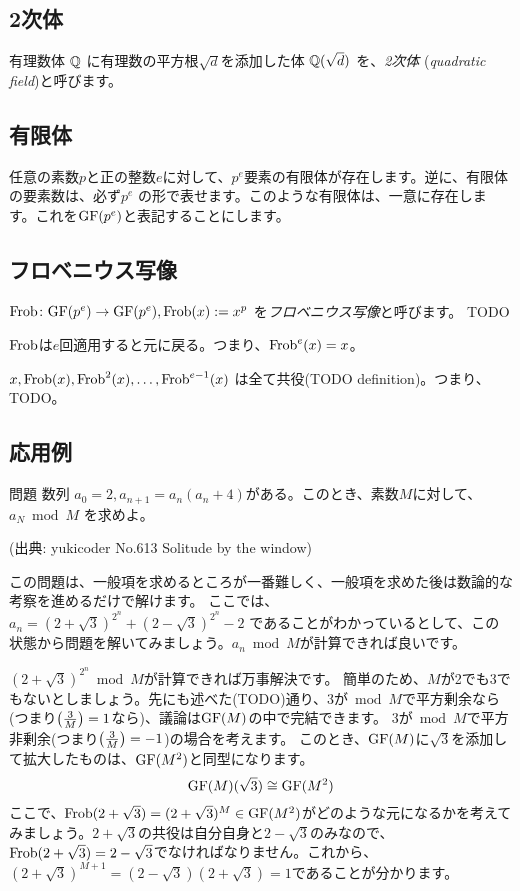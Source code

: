 \documentclass{jsarticle}
\begin{document}
  \subsection{2次体}
  \label{subsec:quadratic-field}
  有理数体 $\mathbb{Q}$ に有理数の平方根$\sqrt{d}$を添加した体 $\mathbb{Q}(\sqrt{d})$ を、\emph{2次体} (\emph{quadratic field})と呼びます。
  \subsection{有限体}
  任意の素数$p$と正の整数$e$に対して、$p^e$要素の有限体が存在します。逆に、有限体の要素数は、必ず$p^e$ の形で表せます。このような有限体は、一意に存在します。これを$\mathrm{GF}(p^e)$と表記することにします。
  \subsection{フロベニウス写像}
  $\mathrm{Frob} \colon \mathrm{GF}(p^e) \to \mathrm{GF}(p^e), \mathrm{Frob}(x) := x^p$ を\emph{フロベニウス写像}と呼びます。 TODO
  \begin{proposition}
   $\mathrm{Frob}$は$e$回適用すると元に戻る。つまり、$\mathrm{Frob}^e(x) = x$。
  \end{proposition}
  \begin{proposition}
   $x, \mathrm{Frob}(x), \mathrm{Frob}^2(x), \ldots, \mathrm{Frob}^{e-1}(x)$ は全て共役(TODO definition)。つまり、TODO。
  \end{proposition}
  \subsection{応用例}
  \begin{itembox}[l]{問題}
   数列 $a_0 = 2, a_{n+1} = a_n(a_n+4)$がある。このとき、素数$M$に対して、$a_N \bmod M$ を求めよ。

   (出典: yukicoder No.613 Solitude by the window)
  \end{itembox}
  この問題は、一般項を求めるところが一番難しく、一般項を求めた後は数論的な考察を進めるだけで解けます。
  ここでは、$a_n = (2+\sqrt{3})^{2^n} + (2-\sqrt{3})^{2^n} - 2$ であることがわかっているとして、この状態から問題を解いてみましょう。$a_n \bmod M$が計算できれば良いです。

  $(2+\sqrt{3})^{2^n} \bmod M$が計算できれば万事解決です。
  簡単のため、$M$が2でも3でもないとしましょう。先にも述べた(TODO)通り、3が${}\bmod M$で平方剰余なら(つまり$\left(\frac{3}{M}\right)=1$なら)、議論は$\mathrm{GF}(M)$の中で完結できます。
  3が${}\bmod M$で平方非剰余(つまり$\left(\frac{3}{M}\right)=-1$)の場合を考えます。
  このとき、$\mathrm{GF}(M)$に$\sqrt{3}$を添加して拡大したものは、$\mathrm{GF}(M^2)$と同型になります。
  \begin{displaymath}
   \mathrm{GF}(M)(\sqrt{3}) \cong \mathrm{GF}(M^2)
  \end{displaymath}
  ここで、$\mathrm{Frob}(2+\sqrt{3}) = (2+\sqrt{3})^M \in \mathrm{GF}(M^2)$がどのような元になるかを考えてみましょう。$2+\sqrt{3}$の共役は自分自身と$2-\sqrt{3}$のみなので、$\mathrm{Frob}(2+\sqrt{3})=2-\sqrt{3}$でなければなりません。これから、$(2+\sqrt{3})^{M+1}=(2-\sqrt{3})(2+\sqrt{3})=1$であることが分かります。
\end{document}
